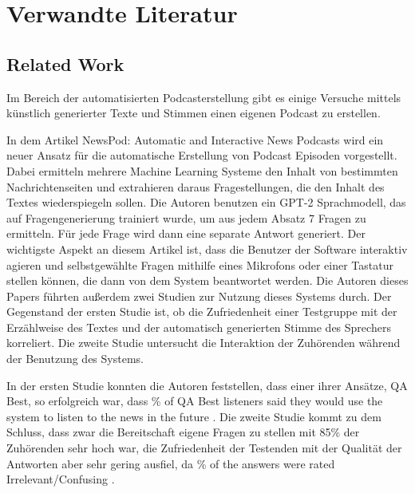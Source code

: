 \chapter{Verwandte Literatur}\label{ch:theoretical}


\section{Related Work}

Im Bereich der automatisierten Podcasterstellung gibt es einige Versuche mittels künstlich generierter Texte und Stimmen einen eigenen Podcast zu erstellen.

In dem Artikel \glqq NewsPod: Automatic and Interactive News Podcasts\grqq{} \cite{laban2022} wird ein neuer Ansatz für die automatische Erstellung von Podcast Episoden vorgestellt. 
Dabei ermitteln mehrere Machine Learning Systeme den Inhalt von bestimmten Nachrichtenseiten und extrahieren daraus Fragestellungen, die den Inhalt des Textes wiederspiegeln sollen. Die Autoren benutzen ein GPT-2 Sprachmodell, das auf Fragengenerierung trainiert wurde, um aus jedem Absatz 7 Fragen zu ermitteln. 
Für jede Frage wird dann eine separate Antwort generiert. 
Der wichtigste Aspekt an diesem Artikel ist, dass die Benutzer der Software interaktiv agieren und selbstgewählte Fragen mithilfe eines Mikrofons oder einer Tastatur stellen können, die dann von dem System beantwortet werden. 
Die Autoren dieses Papers führten außerdem zwei Studien zur Nutzung dieses Systems durch.
Der Gegenstand der ersten Studie ist, ob die Zufriedenheit einer Testgruppe mit der Erzählweise des Textes und der automatisch generierten Stimme des Sprechers korreliert. 
Die zweite Studie untersucht die Interaktion der Zuhörenden während der Benutzung des Systems. 
\cite{laban2022}

In der ersten Studie konnten die Autoren feststellen, dass einer ihrer Ansätze, QA Best,  so erfolgreich war, dass \% of QA Best listeners said they would use the system to listen to the news in the future\grqq{}  \cite{laban2022}.
Die zweite Studie kommt zu dem Schluss, dass zwar die Bereitschaft eigene Fragen zu stellen mit 85\% der Zuhörenden sehr hoch war, die Zufriedenheit der Testenden mit der Qualität der Antworten aber sehr gering ausfiel, da \% of the answers were rated Irrelevant/Confusing\grqq{} \cite{laban2022}.


